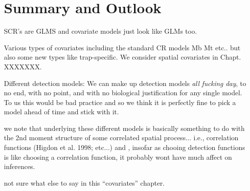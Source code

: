 \section{Summary and Outlook}


SCR's are GLMS and covariate models just look like GLMs too.

Various types of covariates including the standard CR models Mb Mt etc..
but also some new types like trap-specific. We consider spatial covariates
in Chapt. XXXXXXX.


Different detection models: We can make up detection models {\it all fucking 
day}, to no end, with no point, and with no biological justification for
any single model. To us this would be bad practice and so we think it is
perfectly fine to pick a model ahead of time and stick with it. 

we note that underlying these different models is basically something
to do with the 2nd moment structure of some correlated spatial process...
i.e., correlation functions (Higdon et al. 1998; etc...) and , insofar
as chooing detection functions is like choosing a correlation function,
it probably wont have much affect on inferences. 



not sure what else to say in this ``covariates'' chapter. 




